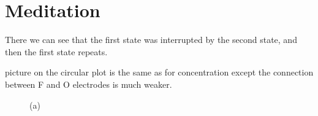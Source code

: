 \vspace*{2cm}


\section{Meditation}
\par There we can see that the first state was interrupted by the second state, and then the first state repeats.
\par picture on the circular plot is the same as for concentration except the connection between F and O electrodes is much weaker.

\begin{figure}[h!]
\begin{minipage}[h]{0.49\linewidth}
 (a) \\
\end{minipage}
\hfill
\begin{minipage}[h]{0.5\linewidth}

\end{minipage}
\end{figure}
